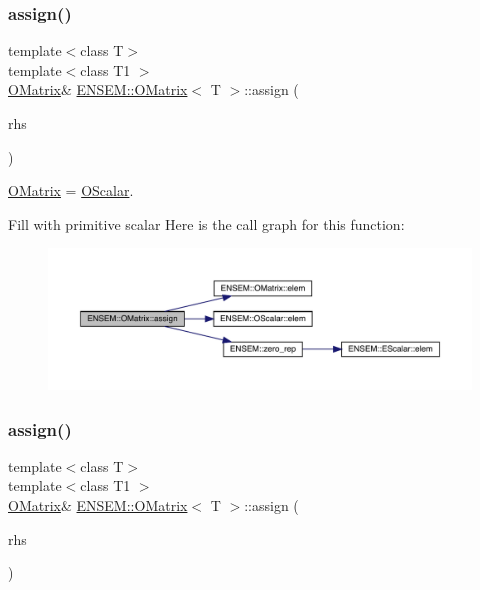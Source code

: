 \subsubsection{\texorpdfstring{assign()}{assign()}\hspace{0.1cm}{\footnotesize\ttfamily [3/6]}}
{\footnotesize\ttfamily template$<$class T$>$ \\
template$<$class T1 $>$ \\
\mbox{\hyperlink{classENSEM_1_1OMatrix}{O\+Matrix}}\& \mbox{\hyperlink{classENSEM_1_1OMatrix}{E\+N\+S\+E\+M\+::\+O\+Matrix}}$<$ T $>$\+::assign (\begin{DoxyParamCaption}\item[{const \mbox{\hyperlink{classENSEM_1_1OScalar}{O\+Scalar}}$<$ T1 $>$ \&}]{rhs }\end{DoxyParamCaption})\hspace{0.3cm}{\ttfamily [inline]}}



\mbox{\hyperlink{classENSEM_1_1OMatrix}{O\+Matrix}} = \mbox{\hyperlink{classENSEM_1_1OScalar}{O\+Scalar}}. 

Fill with primitive scalar Here is the call graph for this function\+:
\nopagebreak
\begin{figure}[H]
\begin{center}
\leavevmode
\includegraphics[width=350pt]{dd/d80/classENSEM_1_1OMatrix_af0aaac940f907eb3db104e9f57b90a4f_cgraph}
\end{center}
\end{figure}
\mbox{\label{classENSEM_1_1OMatrix_af0aaac940f907eb3db104e9f57b90a4f}} 
\subsubsection{\texorpdfstring{assign()}{assign()}\hspace{0.1cm}{\footnotesize\ttfamily [4/6]}}
{\footnotesize\ttfamily template$<$class T$>$ \\
template$<$class T1 $>$ \\
\mbox{\hyperlink{classENSEM_1_1OMatrix}{O\+Matrix}}\& \mbox{\hyperlink{classENSEM_1_1OMatrix}{E\+N\+S\+E\+M\+::\+O\+Matrix}}$<$ T $>$\+::assign (\begin{DoxyParamCaption}\item[{const \mbox{\hyperlink{classENSEM_1_1OScalar}{O\+Scalar}}$<$ T1 $>$ \&}]{rhs }\end{DoxyParamCaption})\hspace{0.3cm}{\ttfamily [inline]}}



